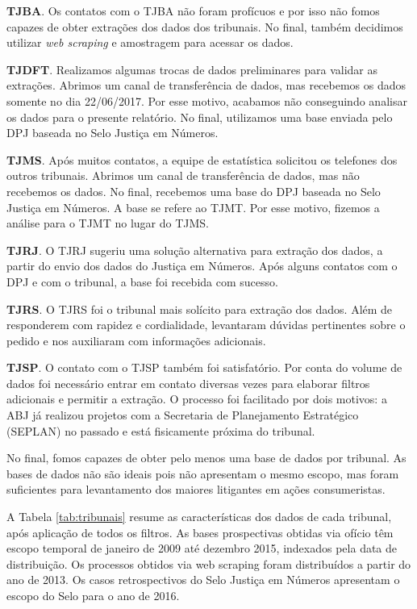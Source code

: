 \documentclass[]{report}
\begin{document}
\textbf{TJBA}. Os contatos com o TJBA não foram profícuos e por isso não
fomos capazes de obter extrações dos dados dos tribunais. No final,
também decidimos utilizar \emph{web scraping} e amostragem para acessar
os dados.

\textbf{TJDFT}. Realizamos algumas trocas de dados preliminares para
validar as extrações. Abrimos um canal de transferência de dados, mas
recebemos os dados somente no dia 22/06/2017. Por esse motivo, acabamos
não conseguindo analisar os dados para o presente relatório. No final,
utilizamos uma base enviada pelo DPJ baseada no Selo Justiça em Números.

\textbf{TJMS}. Após muitos contatos, a equipe de estatística solicitou
os telefones dos outros tribunais. Abrimos um canal de transferência de
dados, mas não recebemos os dados. No final, recebemos uma base do DPJ
baseada no Selo Justiça em Números. A base se refere ao TJMT. Por esse
motivo, fizemos a análise para o TJMT no lugar do TJMS.

\textbf{TJRJ}. O TJRJ sugeriu uma solução alternativa para extração dos
dados, a partir do envio dos dados do Justiça em Números. Após alguns
contatos com o DPJ e com o tribunal, a base foi recebida com sucesso.

\textbf{TJRS}. O TJRS foi o tribunal mais solícito para extração dos
dados. Além de responderem com rapidez e cordialidade, levantaram
dúvidas pertinentes sobre o pedido e nos auxiliaram com informações
adicionais.

\textbf{TJSP}. O contato com o TJSP também foi satisfatório. Por conta
do volume de dados foi necessário entrar em contato diversas vezes para
elaborar filtros adicionais e permitir a extração. O processo foi
facilitado por dois motivos: a ABJ já realizou projetos com a Secretaria
de Planejamento Estratégico (SEPLAN) no passado e está fisicamente
próxima do tribunal.

No final, fomos capazes de obter pelo menos uma base de dados por
tribunal. As bases de dados não são ideais pois não apresentam o mesmo
escopo, mas foram suficientes para levantamento dos maiores litigantes
em ações consumeristas.

A Tabela \ref{tab:tribunais} resume as características dos dados de cada
tribunal, após aplicação de todos os filtros. As bases prospectivas
obtidas via ofício têm escopo temporal de janeiro de 2009 até dezembro
2015, indexados pela data de distribuição. Os processos obtidos via web
scraping foram distribuídos a partir do ano de 2013. Os casos
retrospectivos do Selo Justiça em Números apresentam o escopo do Selo
para o ano de 2016.
\end{document}

